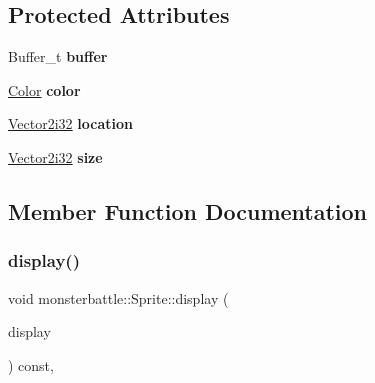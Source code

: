 \subsection*{Protected Attributes}
\begin{DoxyCompactItemize}
\item 
\mbox{\label{classmonsterbattle_1_1Sprite_a322fbff50545816e3997d25394894008}} 
Buffer\+\_\+t {\bfseries buffer}
\item 
\mbox{\label{classmonsterbattle_1_1Sprite_a9909f5cfa23608525af6d357c580baff}} 
\hyperlink{structmonsterbattle_1_1Color}{Color} {\bfseries color}
\item 
\mbox{\label{classmonsterbattle_1_1Sprite_a8418ffd74dd57085c725f18347051c20}} 
\hyperlink{structmonsterbattle_1_1Vector}{Vector2i32} {\bfseries location}
\item 
\mbox{\label{classmonsterbattle_1_1Sprite_a9b864247443a4957d08e33b0e3044a08}} 
\hyperlink{structmonsterbattle_1_1Vector}{Vector2i32} {\bfseries size}
\end{DoxyCompactItemize}


\subsection{Member Function Documentation}
\mbox{\label{classmonsterbattle_1_1Sprite_a9e4c8986170e84e1e92e65d92af4ffee}} 
\subsubsection{\texorpdfstring{display()}{display()}}
{\footnotesize\ttfamily void monsterbattle\+::\+Sprite\+::display (\begin{DoxyParamCaption}\item[{\hyperlink{structmonsterbattle_1_1IDisplay}{I\+Display} \&}]{display }\end{DoxyParamCaption}) const\hspace{0.3cm}{\ttfamily [override]}, {\ttfamily [virtual]}}



